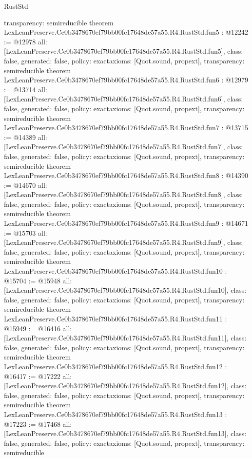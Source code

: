 \begin{lexlean}{RustStd}
\begin{coremodule}
{  transparency: semireducible
}
theorem LexLeanPreserve.Ce0b3478670ef79bb00fc17648de57a55.R4.RustStd.fun5 : @12242 := @12978 {
  all: [LexLeanPreserve.Ce0b3478670ef79bb00fc17648de57a55.R4.RustStd.fun5],
  class: false,
  generated: false,
  policy: exact{axioms: [Quot.sound, propext]},
  transparency: semireducible
}
theorem LexLeanPreserve.Ce0b3478670ef79bb00fc17648de57a55.R4.RustStd.fun6 : @12979 := @13714 {
  all: [LexLeanPreserve.Ce0b3478670ef79bb00fc17648de57a55.R4.RustStd.fun6],
  class: false,
  generated: false,
  policy: exact{axioms: [Quot.sound, propext]},
  transparency: semireducible
}
theorem LexLeanPreserve.Ce0b3478670ef79bb00fc17648de57a55.R4.RustStd.fun7 : @13715 := @14389 {
  all: [LexLeanPreserve.Ce0b3478670ef79bb00fc17648de57a55.R4.RustStd.fun7],
  class: false,
  generated: false,
  policy: exact{axioms: [Quot.sound, propext]},
  transparency: semireducible
}
theorem LexLeanPreserve.Ce0b3478670ef79bb00fc17648de57a55.R4.RustStd.fun8 : @14390 := @14670 {
  all: [LexLeanPreserve.Ce0b3478670ef79bb00fc17648de57a55.R4.RustStd.fun8],
  class: false,
  generated: false,
  policy: exact{axioms: [Quot.sound, propext]},
  transparency: semireducible
}
theorem LexLeanPreserve.Ce0b3478670ef79bb00fc17648de57a55.R4.RustStd.fun9 : @14671 := @15703 {
  all: [LexLeanPreserve.Ce0b3478670ef79bb00fc17648de57a55.R4.RustStd.fun9],
  class: false,
  generated: false,
  policy: exact{axioms: [Quot.sound, propext]},
  transparency: semireducible
}
theorem LexLeanPreserve.Ce0b3478670ef79bb00fc17648de57a55.R4.RustStd.fun10 : @15704 := @15948 {
  all: [LexLeanPreserve.Ce0b3478670ef79bb00fc17648de57a55.R4.RustStd.fun10],
  class: false,
  generated: false,
  policy: exact{axioms: [Quot.sound, propext]},
  transparency: semireducible
}
theorem LexLeanPreserve.Ce0b3478670ef79bb00fc17648de57a55.R4.RustStd.fun11 : @15949 := @16416 {
  all: [LexLeanPreserve.Ce0b3478670ef79bb00fc17648de57a55.R4.RustStd.fun11],
  class: false,
  generated: false,
  policy: exact{axioms: [Quot.sound, propext]},
  transparency: semireducible
}
theorem LexLeanPreserve.Ce0b3478670ef79bb00fc17648de57a55.R4.RustStd.fun12 : @16417 := @17222 {
  all: [LexLeanPreserve.Ce0b3478670ef79bb00fc17648de57a55.R4.RustStd.fun12],
  class: false,
  generated: false,
  policy: exact{axioms: [Quot.sound, propext]},
  transparency: semireducible
}
theorem LexLeanPreserve.Ce0b3478670ef79bb00fc17648de57a55.R4.RustStd.fun13 : @17223 := @17468 {
  all: [LexLeanPreserve.Ce0b3478670ef79bb00fc17648de57a55.R4.RustStd.fun13],
  class: false,
  generated: false,
  policy: exact{axioms: [Quot.sound, propext]},
  transparency: semireducible
}
\end{coremodule}
\end{lexlean}
